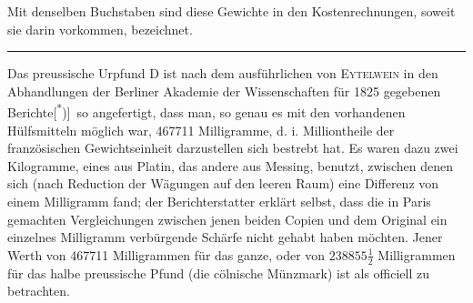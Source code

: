 Mit denselben Buchstaben sind diese Gewichte in den Kostenrechnungen,
soweit sie darin vorkommen, bezeichnet.
\begin{center}\rule{1.35in}{.35pt}\end{center}
\noindent\hspace*{\parindent}Das preussische Urpfund D ist nach dem ausführlichen von \textsc{Eytelwein}
in den Abhandlungen der Berliner Akademie der Wissenschaften für 1825 gegebenen
Berichte[\textsuperscript{*})]\begingroup\renewcommand{\thefootnote}{}\endgroup\ so angefertigt, dass man, so genau es mit den vorhandenen
Hülfsmitteln möglich war, 467711 Milligramme, d. i. Milliontheile der französischen
Gewichtseinheit darzustellen sich bestrebt hat. Es waren dazu zwei
Kilogramme, eines aus Platin, das andere aus Messing, benutzt, zwischen
denen sich (nach Reduction der Wägungen auf den leeren Raum) eine Differenz
von einem Milligramm fand; der Berichterstatter erklärt selbst, dass die
in Paris gemachten Vergleichungen zwischen jenen beiden Copien und dem
Original ein einzelnes Milligramm verbürgende Schärfe nicht gehabt haben
möchten. Jener Werth von 467711 Milligrammen für das ganze, oder von
\(238855\frac{1}{2}\) Milligrammen für das halbe preussische Pfund (die cölnische Münzmark)
ist als officiell zu betrachten.
\par\clearpage\endgroup
